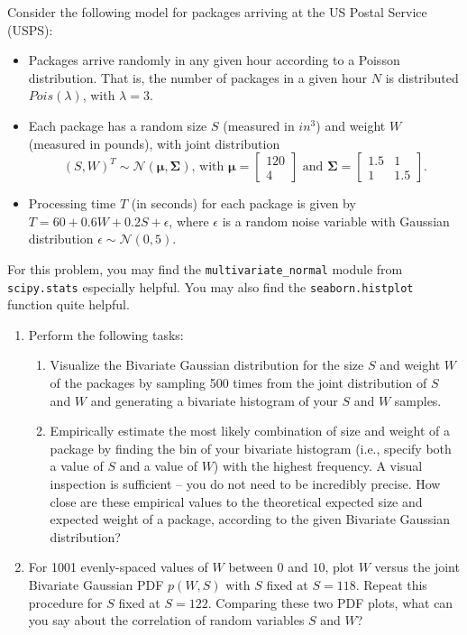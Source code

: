 \documentclass{harvardml}
\theoremstyle{definition}
\theoremstyle{plain}
\begin{document}
\begin{problem}
\noindent Consider the following model for packages arriving at the US Postal Service (USPS):
\begin{itemize}
    \item Packages arrive randomly in any given hour according to a Poisson distribution. That is, the number of packages in a given hour $N$ is distributed $Pois(\lambda)$, with $\lambda = 3$.
    \item Each package has a random size $S$ (measured in $in^3$) and weight $W$ (measured in pounds), with joint distribution
    $$(S, W)^{T} \sim \mathcal{N}\left( \boldsymbol{\mu}, \boldsymbol{\Sigma}\right) \text{, with } \boldsymbol{\mu} = \begin{bmatrix} 120 \\ 4 \end{bmatrix} \text{ and } \boldsymbol{\Sigma} = \begin{bmatrix} 1.5 & 1 \\ 1 & 1.5 \end{bmatrix}.$$
    \item Processing time $T$ (in seconds) for each package is given by $T = 60 + 0.6 W + 0.2 S + \epsilon$, where $\epsilon$ is a random noise variable with Gaussian distribution $\epsilon \sim \mathcal{N}(0, 5)$.
\end{itemize}
For this problem, you may find the \texttt{multivariate\_normal} module from \texttt{scipy.stats} especially helpful. You may also find the \texttt{seaborn.histplot} function quite helpful. 
\begin{enumerate}
    \item Perform the following tasks:
    \begin{enumerate}
        \item Visualize the Bivariate Gaussian distribution for the size $S$ and weight $W$ of the packages by sampling 500 times from the joint distribution of $S$ and $W$ and generating a bivariate histogram of your $S$ and $W$ samples.
        \item Empirically estimate the most likely combination of size and weight of a package by finding the bin of your bivariate histogram (i.e., specify both a value of $S$ and a value of $W$) with the highest frequency. A visual inspection is sufficient -- you do not need to be incredibly precise.  How close are these empirical values to the theoretical expected size and expected weight of a package, according to the given Bivariate Gaussian distribution?
    \end{enumerate}
    \item For 1001 evenly-spaced values of $W$ between $0$ and $10$, plot $W$ versus the joint Bivariate Gaussian PDF $p(W, S)$ with $S$ fixed at $S=118$. Repeat this procedure for $S$ fixed at $S=122$. Comparing these two PDF plots, what can you say about the correlation of random variables $S$ and $W$?

\end{enumerate}
\end{problem}
\end{document}
